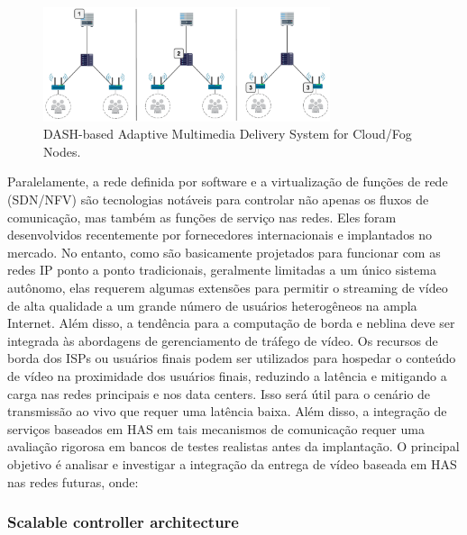 \vspace{0.8cm}
\begin{figure}[htpb]
	\centering
	\includegraphics[width=0.75\textwidth]{img/exp-multi-lvl}
	\caption{DASH-based Adaptive Multimedia Delivery System for Cloud/Fog Nodes.}
	\label{fig:scenario-arch}
\end{figure}


Paralelamente, a rede definida por software e a virtualização de funções de rede (SDN/NFV) são tecnologias notáveis para controlar não apenas os fluxos de comunicação, mas também as funções de serviço nas redes. Eles foram desenvolvidos recentemente por fornecedores internacionais e implantados no mercado. No entanto, como são basicamente projetados para funcionar com as redes IP ponto a ponto tradicionais, geralmente limitadas a um único sistema autônomo, elas requerem algumas extensões para permitir o streaming de vídeo de alta qualidade a um grande número de usuários heterogêneos na ampla Internet. 
Além disso, a tendência para a computação de borda e neblina deve ser integrada às abordagens de gerenciamento de tráfego de vídeo. Os recursos de borda dos ISPs ou usuários finais podem ser utilizados para hospedar o conteúdo de vídeo na proximidade dos usuários finais, reduzindo a latência e mitigando a carga nas redes principais e nos data centers. Isso será útil para o cenário de transmissão ao vivo que requer uma latência baixa. Além disso, a integração de serviços baseados em HAS em tais mecanismos de comunicação requer uma avaliação rigorosa em bancos de testes realistas antes da implantação. O principal objetivo é analisar e investigar a integração da entrega de vídeo baseada em HAS nas redes futuras, onde:


\subsubsection{Scalable controller architecture}
\label{subsec:sca-contrl-arch}


